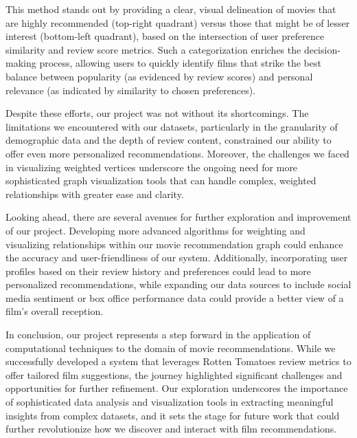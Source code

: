 \documentclass[fontsize=11pt]{article}
\begin{document}
\noindent This method stands out by providing a clear, visual delineation of movies that are highly recommended (top-right quadrant) versus those that might be of lesser interest (bottom-left quadrant), based on the intersection of user preference similarity and review score metrics. Such a categorization enriches the decision-making process, allowing users to quickly identify films that strike the best balance between popularity (as evidenced by review scores) and personal relevance (as indicated by similarity to chosen preferences).
\vspace{0.5cm}

\noindent Despite these efforts, our project was not without its shortcomings. The limitations we encountered with our datasets, particularly in the granularity of demographic data and the depth of review content, constrained our ability to offer even more personalized recommendations. Moreover, the challenges we faced in visualizing weighted vertices underscore the ongoing need for more sophisticated graph visualization tools that can handle complex, weighted relationships with greater ease and clarity.
\vspace{0.5cm}

\noindent Looking ahead, there are several avenues for further exploration and improvement of our project. Developing more advanced algorithms for weighting and visualizing relationships within our movie recommendation graph could enhance the accuracy and user-friendliness of our system. Additionally, incorporating user profiles based on their review history and preferences could lead to more personalized recommendations, while expanding our data sources to include social media sentiment or box office performance data could provide a better view of a film's overall reception.
\vspace{0.5cm}

\noindent In conclusion, our project represents a step forward in the application of computational techniques to the domain of movie recommendations. While we successfully developed a system that leverages Rotten Tomatoes review metrics to offer tailored film suggestions, the journey highlighted significant challenges and opportunities for further refinement. Our exploration underscores the importance of sophisticated data analysis and visualization tools in extracting meaningful insights from complex datasets, and it sets the stage for future work that could further revolutionize how we discover and interact with film recommendations.
\end{document}
